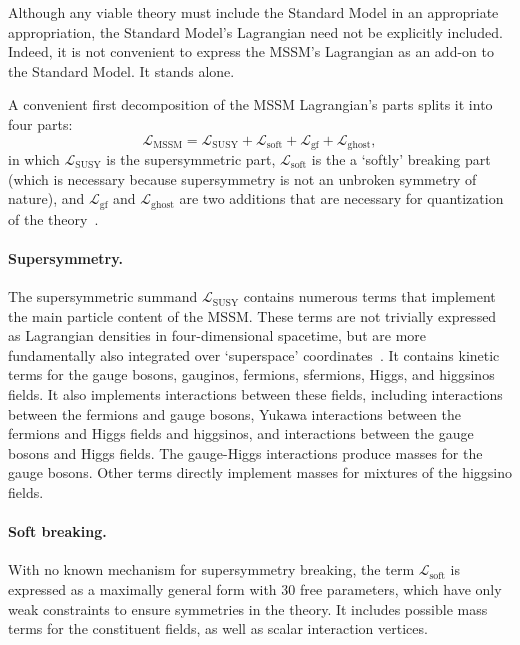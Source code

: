 Although any viable theory must include the Standard Model in an appropriate
appropriation, the Standard Model's Lagrangian need not be explicitly included.
Indeed, it is not convenient to express the MSSM's Lagrangian as an add-on to
the Standard Model. It stands alone.

A convenient first decomposition of the MSSM Lagrangian's parts splits it into
four parts:
\begin{equation}
\mathcal{L}_\mathrm{MSSM} =
\mathcal{L}_\mathrm{SUSY}
+ \mathcal{L}_\mathrm{soft}
+ \mathcal{L}_\mathrm{gf}
+ \mathcal{L}_\mathrm{ghost}
,
\end{equation}
in which
$\mathcal{L}_\mathrm{SUSY}$ is the supersymmetric part,
$\mathcal{L}_\mathrm{soft}$ is the a `softly' breaking part
(which is necessary because supersymmetry is not an unbroken symmetry of
nature),
and
$\mathcal{L}_\mathrm{gf}$ and $\mathcal{L}_\mathrm{ghost}$
are two additions that are necessary for quantization of the
theory~\cite{kuroda1999complete}.

\paragraph{Supersymmetry.}
The supersymmetric summand $\mathcal{L}_\mathrm{SUSY}$ contains numerous terms
that implement the main particle content of the MSSM.
These terms are not trivially expressed as Lagrangian densities in
four-dimensional spacetime, but are more fundamentally also integrated over
`superspace' coordinates~\cite{martin2016primer, kuroda1999complete}.
It contains kinetic terms for the gauge bosons, gauginos, fermions, sfermions,
Higgs, and higgsinos fields.
It also implements interactions between these fields,
including interactions between the fermions and gauge bosons,
Yukawa interactions between the fermions and Higgs fields and higgsinos,
and interactions between the gauge bosons and Higgs fields.
The gauge-Higgs interactions produce masses for the gauge bosons.
Other terms directly implement masses for mixtures of the higgsino fields.

\paragraph{Soft breaking.}
With no known mechanism for supersymmetry breaking,
the term $\mathcal{L}_\mathrm{soft}$ is expressed as a maximally general form
with $30$ free parameters, which have only weak constraints to ensure
symmetries in the theory.
It includes possible mass terms for the constituent fields, as well as scalar
interaction vertices.

